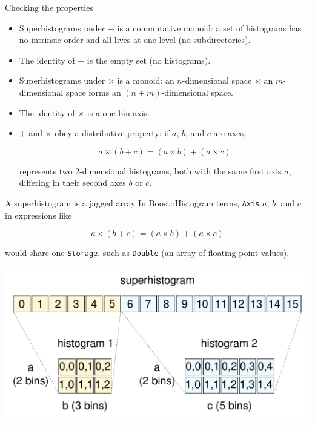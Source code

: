 \documentclass[aspectratio=169]{beamer}
\begin{document}
\begin{frame}{Checking the properties}
\vspace{0.5 cm}
\large

\begin{itemize}\setlength{\itemsep}{0.25 cm}
\item<1-> Superhistograms under $+$ is a commutative monoid: a set of histograms has no intrinsic order and all lives at one level (no subdirectories).
\item<1-> The identity of $+$ is the empty set (no histograms).
\item<2-> Superhistograms under $\times$ is a monoid: an $n$-dimensional space $\times$ an $m$-dimensional space forms an $(n + m)$-dimensional space.
\item<2-> The identity of $\times$ is a one-bin axis.
\item<3-> $+$ and $\times$ obey a distributive property: if $a$, $b$, and $c$ are axes,

\vspace{-0.25 cm}
\[ a \times (b + c) = (a \times b) + (a \times c) \]

represents two 2-dimensional histograms, both with the same first axis $a$, differing in their second axes $b$ or $c$.
\end{itemize}
\end{frame}

\begin{frame}{A superhistogram is a jagged array}
\vspace{0.25 cm}
\large
In Boost::Histogram terms, \texttt{Axis} $a$, $b$, and $c$ in expressions like

\vspace{-0.2 cm}
\[ a \times (b + c) = (a \times b) + (a \times c) \]

\vspace{0.2 cm}
would share one \texttt{Storage}, such as \texttt{Double} (an array of floating-point values).

\begin{center}
\includegraphics[width=0.8\linewidth]{sharing-storage.pdf}
\end{center}
\end{frame}
\end{document}
